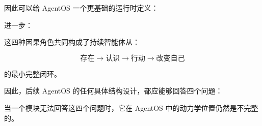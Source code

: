 因此可以给 AgentOS 一个更基础的运行时定义：

\begin{statementbox}
\centering
{}
\end{statementbox}

进一步：

\begin{statementbox}
\centering
{}
\end{statementbox}

这四种因果角色共同构成了持续智能体从：

\[
\text{存在}
\rightarrow
\text{认识}
\rightarrow
\text{行动}
\rightarrow
\text{改变自己}
\]

的最小完整闭环。

因此，后续 AgentOS 的任何具体结构设计，都应能够回答四个问题：

\begin{statementbox}
\centering
{}
\end{statementbox}

\begin{statementbox}
\centering
{}
\end{statementbox}

\begin{statementbox}
\centering
{}
\end{statementbox}

\begin{statementbox}
\centering
{}
\end{statementbox}

当一个模块无法回答这四个问题时，它在 AgentOS 中的动力学位置仍然是不完整的。
